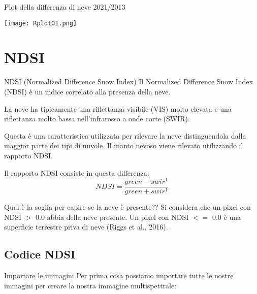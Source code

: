 \documentclass{beamer}
\begin{document}
\begin{frame}{Plot della differenza di neve 2021/2013}
 
\texttt{[image: Rplot01.png]}   
    
\end{frame}

\section{NDSI}

\begin{frame}{NDSI (Normalized Difference Snow Index)}
  Il Normalized Difference Snow Index (NDSI) è un indice correlato alla presenza della neve.
  
  La neve ha tipicamente una riflettanza visibile (VIS) molto elevata e una riflettanza molto bassa nell'infrarosso a onde corte (SWIR).
  
  Questa è una caratteristica utilizzata per rilevare la neve distinguendola dalla maggior parte dei tipi di nuvole. Il manto nevoso viene rilevato utilizzando il rapporto NDSI.
  \bigskip
  
  Il rapporto NDSI consiste in questa differenza:
  \bigskip
  \centering
  \begin{equation}
NDSI=\frac{green-swir^1}{green+swir^1}
\nonumber
\end{equation}

\end{frame}



\begin{frame}{Qual è la soglia per capire se la neve è presente??}
 \centering
 Si considera che un pixel con NDSI $>$ 0.0 abbia della neve presente. Un pixel con NDSI $<=$ 0.0 è una superficie terrestre priva di neve (Riggs et al., 2016).   
    
\end{frame}


\subsection{Codice NDSI}
\begin{frame}{Importare le immagini}
Per prima cosa possiamo importare tutte le nostre immagini per creare la nostra immagine multispettrale:
\bigskip
\scriptsize
    
\end{frame}
\end{document}
